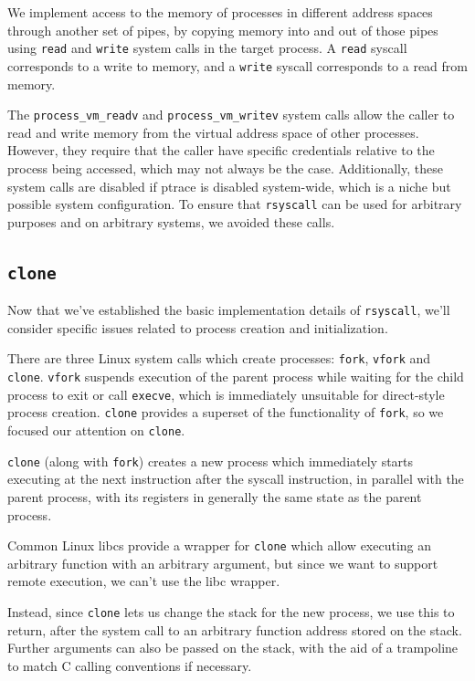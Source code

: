 \documentclass[letterpaper,twocolumn,10pt]{article}
\begin{document}
We implement access to the memory of processes in different address spaces through another set of pipes,
by copying memory into and out of those pipes using \texttt{read} and \texttt{write} system calls in the target process.
A \texttt{read} syscall corresponds to a write to memory,
and a \texttt{write} syscall corresponds to a read from memory.

The \verb|process_vm_readv| and \verb|process_vm_writev| system calls
allow the caller to read and write memory from the virtual address space of other processes.
However, they require that the caller have specific credentials relative to the process being accessed,
which may not always be the case.
Additionally, these system calls are disabled if ptrace is disabled system-wide,
which is a niche but possible system configuration.
To ensure that \texttt{rsyscall} can be used for arbitrary purposes and on arbitrary systems, we avoided these calls.
\subsection{\texttt{clone}}\label{clone}
Now that we've established the basic implementation details of \texttt{rsyscall},
we'll consider specific issues related to process creation and initialization.

There are three Linux system calls which create processes:
\texttt{fork}, \texttt{vfork} and \texttt{clone}.
\texttt{vfork} suspends execution of the parent process
while waiting for the child process to exit or call \texttt{execve},
which is immediately unsuitable for direct-style process creation.
\texttt{clone} provides a superset of the functionality of \texttt{fork},
so we focused our attention on \texttt{clone}.

\texttt{clone}
(along with \texttt{fork}) creates a new process
which immediately starts executing at the next instruction after the syscall instruction,
in parallel with the parent process,
with its registers in generally the same state as the parent process.

Common Linux libcs provide a wrapper for \texttt{clone}
which allow executing an arbitrary function with an arbitrary argument,
but since we want to support remote execution,
we can't use the libc wrapper.

Instead, since \texttt{clone} lets us change the stack for the new process,
we use this to return, after the system call to an arbitrary function address stored on the stack.
Further arguments can also be passed on the stack,
with the aid of a trampoline to match C calling conventions if necessary.
\end{document}
